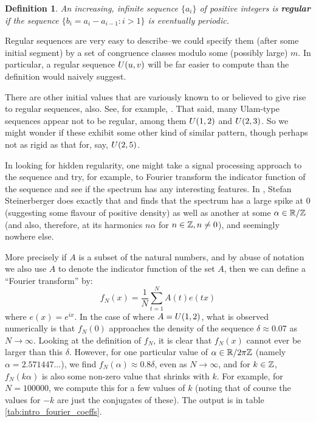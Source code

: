 \documentclass{report}
\newtheorem{definition}[theorem]{Definition}
\theoremstyle{remark}
\numberwithin{equation}{section}
\begin{document}
\begin{definition}\label{def:regularity}
  An increasing, infinite sequence $\{a_i\}$ of positive integers is
  \textbf{regular} if the sequence $\{b_i = a_i - a_{i-1} : i > 1\}$
  is eventually periodic.
\end{definition}

Regular sequences are very easy to describe--we could specify them
(after some initial segment) by a set of congruence classes modulo
some (possibly large) $m$.  In particular, a regular sequence
$U(u,v)$ will be far easier to compute than the definition would
naively suggest.

There are other initial values that are variously known to or believed
to give rise to regular sequences, also.  See, for example,
\cite{finch:em1992}.  That said, many Ulam-type sequences appear not
to be regular, among them $U(1,2)$ and $U(2,3)$.  So we
might wonder if these exhibit some other kind of similar pattern,
though perhaps not as rigid as that for, say, $U(2,5)$.

In looking for hidden regularity, one might take a signal processing
approach to the sequence and try, for example, to Fourier transform
the indicator function of the sequence and see if the spectrum has any
interesting features.  In \cite{steinerberger:preprint}, Stefan
Steinerberger does exactly that and finds that the spectrum has a
large spike at 0 (suggesting some flavour of positive density) as well
as another at some $\alpha \in \mathbb{R}/\mathbb{Z}$ (and also, therefore, at its
harmonics $n\alpha$ for $n \in \mathbb{Z}, n \neq 0$), and seemingly nowhere
else.

More precisely if $A$ is a subset of the natural numbers, and by abuse
of notation we also use $A$ to denote the indicator function of the
set $A$, then we can define a ``Fourier transform'' by:
\[f_N(x) = \frac{1}{N}\sum_{t=1}^N A(t) e(tx)\] where $e(x) = e^{ix}$.
In the case of where $A = U(1,2)$, what is observed numerically
is that $f_N(0)$ approaches the density of the sequence
$\delta \approx 0.07$ as $N \to \infty$.  Looking at the definition of
$f_N$, it is clear that $f_N(x)$ cannot ever be larger than this
$\delta$.  However, for one particular value of $\alpha \in \mathbb{R}/2\pi\mathbb{Z}$
(namely $\alpha = 2.571447\ldots$), we find
$f_N(\alpha) \approx 0.8 \delta$, even as $N \to \infty$, and for
$k \in \mathbb{Z}$, $f_N(k \alpha)$ is also some non-zero value that shrinks
with $k$.  For example, for $N = 100000$, we compute this for a few
values of $k$ (noting that of course the values for $-k$ are just the
conjugates of these).  The output is in table
\ref{tab:intro_fourier_coeffs}.
\end{document}
